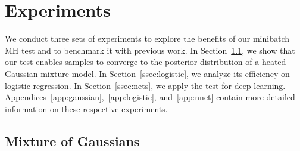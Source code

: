 \documentclass{article}
\newtheorem{theorem}{Theorem}
\begin{document}




\section{Experiments}\label{sec:experiments}

We conduct three sets of experiments to explore the benefits of our minibatch MH test and to
benchmark it with previous work. In Section~\ref{ssec:gaussians}, we show that our test enables
samples to converge to the posterior distribution of a heated Gaussian mixture model. In
Section~\ref{ssec:logistic}, we analyze its efficiency on logistic regression. In
Section~\ref{ssec:nets}, we apply the test for deep learning.
Appendices~\ref{app:gaussian},~\ref{app:logistic}, and~\ref{app:nnet} contain more detailed
information on these respective experiments.

\subsection{Mixture of Gaussians}\label{ssec:gaussians}
\end{document}
